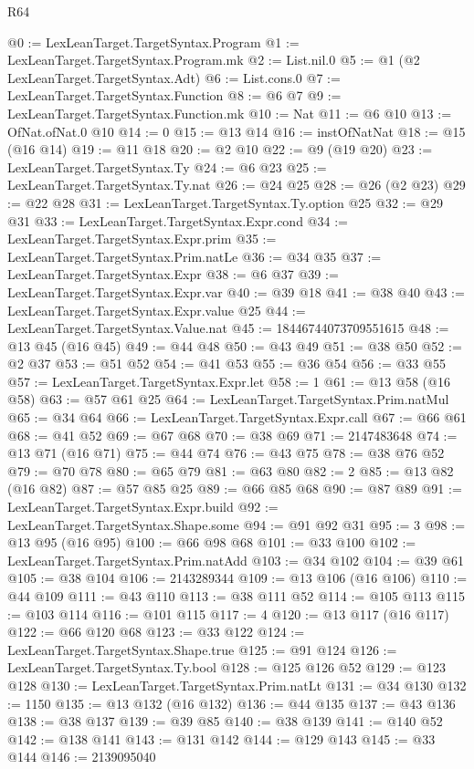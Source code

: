 \begin{lexlean}{R64}
\begin{coremodule}
@0 := LexLeanTarget.TargetSyntax.Program
@1 := LexLeanTarget.TargetSyntax.Program.mk
@2 := List.nil.{0}
@5 := @1 (@2 LexLeanTarget.TargetSyntax.Adt)
@6 := List.cons.{0}
@7 := LexLeanTarget.TargetSyntax.Function
@8 := @6 @7
@9 := LexLeanTarget.TargetSyntax.Function.mk
@10 := Nat
@11 := @6 @10
@13 := OfNat.ofNat.{0} @10
@14 := 0
@15 := @13 @14
@16 := instOfNatNat
@18 := @15 (@16 @14)
@19 := @11 @18
@20 := @2 @10
@22 := @9 (@19 @20)
@23 := LexLeanTarget.TargetSyntax.Ty
@24 := @6 @23
@25 := LexLeanTarget.TargetSyntax.Ty.nat
@26 := @24 @25
@28 := @26 (@2 @23)
@29 := @22 @28
@31 := LexLeanTarget.TargetSyntax.Ty.option @25
@32 := @29 @31
@33 := LexLeanTarget.TargetSyntax.Expr.cond
@34 := LexLeanTarget.TargetSyntax.Expr.prim
@35 := LexLeanTarget.TargetSyntax.Prim.natLe
@36 := @34 @35
@37 := LexLeanTarget.TargetSyntax.Expr
@38 := @6 @37
@39 := LexLeanTarget.TargetSyntax.Expr.var
@40 := @39 @18
@41 := @38 @40
@43 := LexLeanTarget.TargetSyntax.Expr.value @25
@44 := LexLeanTarget.TargetSyntax.Value.nat
@45 := 18446744073709551615
@48 := @13 @45 (@16 @45)
@49 := @44 @48
@50 := @43 @49
@51 := @38 @50
@52 := @2 @37
@53 := @51 @52
@54 := @41 @53
@55 := @36 @54
@56 := @33 @55
@57 := LexLeanTarget.TargetSyntax.Expr.let
@58 := 1
@61 := @13 @58 (@16 @58)
@63 := @57 @61 @25
@64 := LexLeanTarget.TargetSyntax.Prim.natMul
@65 := @34 @64
@66 := LexLeanTarget.TargetSyntax.Expr.call
@67 := @66 @61
@68 := @41 @52
@69 := @67 @68
@70 := @38 @69
@71 := 2147483648
@74 := @13 @71 (@16 @71)
@75 := @44 @74
@76 := @43 @75
@78 := @38 @76 @52
@79 := @70 @78
@80 := @65 @79
@81 := @63 @80
@82 := 2
@85 := @13 @82 (@16 @82)
@87 := @57 @85 @25
@89 := @66 @85 @68
@90 := @87 @89
@91 := LexLeanTarget.TargetSyntax.Expr.build
@92 := LexLeanTarget.TargetSyntax.Shape.some
@94 := @91 @92 @31
@95 := 3
@98 := @13 @95 (@16 @95)
@100 := @66 @98 @68
@101 := @33 @100
@102 := LexLeanTarget.TargetSyntax.Prim.natAdd
@103 := @34 @102
@104 := @39 @61
@105 := @38 @104
@106 := 2143289344
@109 := @13 @106 (@16 @106)
@110 := @44 @109
@111 := @43 @110
@113 := @38 @111 @52
@114 := @105 @113
@115 := @103 @114
@116 := @101 @115
@117 := 4
@120 := @13 @117 (@16 @117)
@122 := @66 @120 @68
@123 := @33 @122
@124 := LexLeanTarget.TargetSyntax.Shape.true
@125 := @91 @124
@126 := LexLeanTarget.TargetSyntax.Ty.bool
@128 := @125 @126 @52
@129 := @123 @128
@130 := LexLeanTarget.TargetSyntax.Prim.natLt
@131 := @34 @130
@132 := 1150
@135 := @13 @132 (@16 @132)
@136 := @44 @135
@137 := @43 @136
@138 := @38 @137
@139 := @39 @85
@140 := @38 @139
@141 := @140 @52
@142 := @138 @141
@143 := @131 @142
@144 := @129 @143
@145 := @33 @144
@146 := 2139095040

\end{coremodule}
\end{lexlean}
